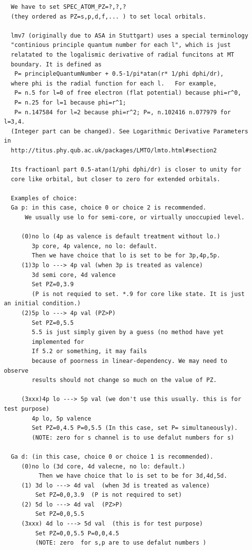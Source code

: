 \documentclass[a4paper,10pt,epsf,fleqn]{article}
\begin{document}
{\begin{verbatim}
  We have to set SPEC_ATOM_PZ=?,?,? 
  (they ordered as PZ=s,p,d,f,... ) to set local orbitals.
  
  lmv7 (originally due to ASA in Stuttgart) uses a special terminology
  "continious principle quantum number for each l", which is just
  relatated to the logalismic derivative of radial funcitons at MT
  boundary. It is defined as
   P= principleQuantumNumber + 0.5-1/pi*atan(r* 1/phi dphi/dr),
  where phi is the radial function for each l.   For example, 
   P= n.5 for l=0 of free electron (flat potential) because phi=r^0,
   P= n.25 for l=1 because phi=r^1; 
   P= n.147584 for l=2 because phi=r^2; P=, n.102416 n.077979 for l=3,4.
  (Integer part can be changed). See Logarithmic Derivative Parameters in
  http://titus.phy.qub.ac.uk/packages/LMTO/lmto.html#section2

  Its fractioanl part 0.5-atan(1/phi dphi/dr) is closer to unity for
  core like orbital, but closer to zero for extended orbitals.

  Examples of choice:
  Ga p: in this case, choice 0 or choice 2 is recommended.
      We usually use lo for semi-core, or virtually unoccupied level.

     (0)no lo (4p as valence is default treatment without lo.)
        3p core, 4p valence, no lo: default.
        Then we have choice that lo is set to be for 3p,4p,5p.
     (1)3p lo ---> 4p val (when 3p is treated as valence)
        3d semi core, 4d valence  
        Set PZ=0,3.9 
        (P is not requied to set. *.9 for core like state. It is just an initial condition.)
     (2)5p lo ---> 4p val (PZ>P)
        Set PZ=0,5.5 
        5.5 is just simply given by a guess (no method have yet
		implemented for 
        If 5.2 or something, it may fails
        because of poorness in linear-dependency. We may need to observe
        results should not change so much on the value of PZ.

     (3xxx)4p lo ---> 5p val (we don't use this usually. this is for test purpose)
        4p lo, 5p valence 
        Set PZ=0,4.5 P=0,5.5 (In this case, set P= simultaneously).
        (NOTE: zero for s channel is to use defalut numbers for s)

  Ga d: (in this case, choice 0 or choice 1 is recommended).
     (0)no lo (3d core, 4d valecne, no lo: default.)
          Then we have choice that lo is set to be for 3d,4d,5d.
     (1) 3d lo ---> 4d val  (when 3d is treated as valence)
         Set PZ=0,0,3.9  (P is not required to set)
     (2) 5d lo ---> 4d val  (PZ>P)
         Set PZ=0,0,5.5
     (3xxx) 4d lo ---> 5d val  (this is for test purpose)
         Set PZ=0,0,5.5 P=0,0,4.5
         (NOTE: zero  for s,p are to use defalut numbers )


\end{verbatim}}
\end{document}
